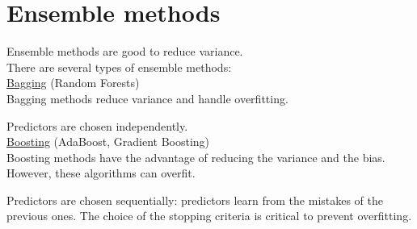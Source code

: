 \section*{Ensemble methods}

Ensemble methods are good to reduce variance. \\

There are several types of ensemble methods:  \\

\underline{Bagging} (Random Forests) \\

Bagging methods reduce variance and handle overfitting.

Predictors are chosen independently. \\

\underline{Boosting} (AdaBoost, Gradient Boosting) \\

Boosting methods have the advantage of reducing the variance and the bias. However, these algorithms can overfit.

Predictors are chosen sequentially: predictors learn from the mistakes of the previous ones. The choice of the stopping criteria is critical to prevent overfitting.

\vspace{5mm}